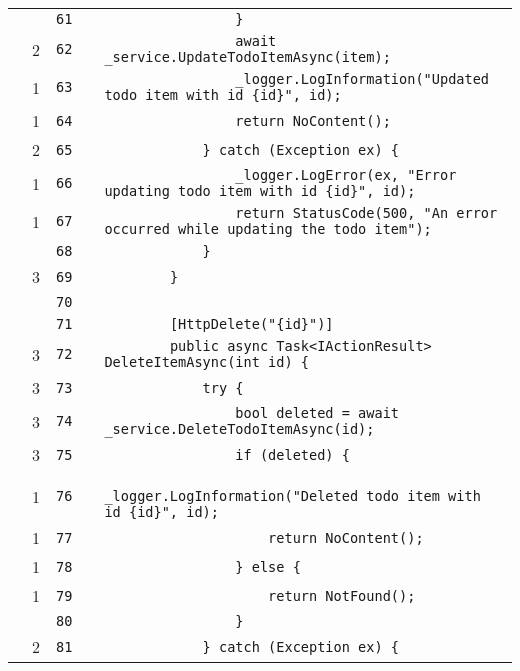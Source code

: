 \documentclass[a4paper,landscape,10pt]{article}
\begin{document}
\begin{longtable}[l]{lrrll}
\cellcolor{gray} &  & \verb~61~ & & \verb~                }~\\
\cellcolor{green} & 2 & \verb~62~ & & \verb~                await _service.UpdateTodoItemAsync(item);~\\
\cellcolor{green} & 1 & \verb~63~ & & \verb~                _logger.LogInformation("Updated todo item with id {id}", id);~\\
\cellcolor{green} & 1 & \verb~64~ & & \verb~                return NoContent();~\\
\cellcolor{green} & 2 & \verb~65~ & & \verb~            } catch (Exception ex) {~\\
\cellcolor{green} & 1 & \verb~66~ & & \verb~                _logger.LogError(ex, "Error updating todo item with id {id}", id);~\\
\cellcolor{green} & 1 & \verb~67~ & & \verb~                return StatusCode(500, "An error occurred while updating the todo item");~\\
\cellcolor{gray} &  & \verb~68~ & & \verb~            }~\\
\cellcolor{green} & 3 & \verb~69~ & & \verb~        }~\\
\cellcolor{gray} &  & \verb~70~ & & \verb~~\\
\cellcolor{gray} &  & \verb~71~ & & \verb~        [HttpDelete("{id}")]~\\
\cellcolor{green} & 3 & \verb~72~ & & \verb~        public async Task<IActionResult> DeleteItemAsync(int id) {~\\
\cellcolor{green} & 3 & \verb~73~ & & \verb~            try {~\\
\cellcolor{green} & 3 & \verb~74~ & & \verb~                bool deleted = await _service.DeleteTodoItemAsync(id);~\\
\cellcolor{green} & 3 & \verb~75~ & & \verb~                if (deleted) {~\\
\cellcolor{green} & 1 & \verb~76~ & & \verb~                    _logger.LogInformation("Deleted todo item with id {id}", id);~\\
\cellcolor{green} & 1 & \verb~77~ & & \verb~                    return NoContent();~\\
\cellcolor{green} & 1 & \verb~78~ & & \verb~                } else {~\\
\cellcolor{green} & 1 & \verb~79~ & & \verb~                    return NotFound();~\\
\cellcolor{gray} &  & \verb~80~ & & \verb~                }~\\
\cellcolor{green} & 2 & \verb~81~ & & \verb~            } catch (Exception ex) {~\\

\end{longtable}
\end{document}
